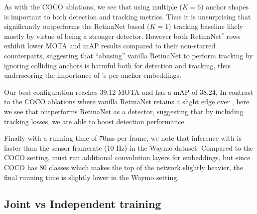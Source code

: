 As with the COCO ablations, we see that using multiple
($K=6$) anchor shapes is important to both detection
and tracking metrics.
Thus it is unsurprising that
\modelname significantly outperforms the RetinaNet based ($K=1$) tracking baseline likely mostly by virtue of being a stronger detector.
However both RetinaNet$^*$ rows exhibit lower MOTA and mAP results compared to their
non-starred counterparts, suggesting that ``abusing'' vanilla RetinaNet to perform
tracking by ignoring colliding anchors is harmful both for detection and tracking, 
thus underscoring the importance of \modelname's per-anchor embeddings.

Our best \modelname configuration reaches 39.12 MOTA and has a mAP of 38.24.
In contrast to the COCO ablations where vanilla RetinaNet retains a
slight edge over \modelname, here 
we see that \modelname outperforms  RetinaNet as a detector, suggesting that by
 including  tracking losses, we are able to boost detection performance.

 

 

Finally with a running time of 70ms per frame, we note that
inference with \modelname is faster than
the sensor framerate (10 Hz) in the Waymo dataset. 
Compared to the COCO setting, \modelname must run additional
convolution layers for embeddings, but since COCO has 80 classes which
makes the top of the network slightly heavier, the final running time is
slightly lower in the Waymo setting.

    
\vspace{-1mm}
\subsection{Joint vs Independent training}\label{sec:joint}
\vspace{-1mm}

